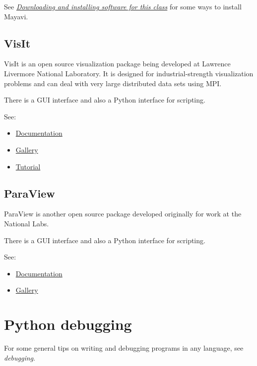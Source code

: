 \documentclass[letterpaper,10pt,english]{sphinxmanual}
\begin{document}
See {\hyperref[software_installation:software-installation]{\emph{Downloading and installing software for this class}}} for some ways to install Mayavi.


\subsection{VisIt}
\label{python_plotting:visit}\label{python_plotting:id1}
VisIt is an open source visualization package being developed at Lawrence Livermore
National Laboratory.  It is designed for industrial-strength visualization problems
and can deal with very large distributed data sets using MPI.

There is a GUI interface and also a Python interface for scripting.

See:
\begin{itemize}
\item {} 
\href{https://wci.llnl.gov/codes/visit/doc.html}{Documentation}

\item {} 
\href{https://wci.llnl.gov/codes/visit/gallery.html}{Gallery}

\item {} 
\href{http://www.visitusers.org/index.php?title=Short\_Tutorial}{Tutorial}

\end{itemize}


\subsection{ParaView}
\label{python_plotting:id4}\label{python_plotting:paraview}
ParaView is another open source package developed originally for work at the
National Labs.

There is a GUI interface and also a Python interface for scripting.

See:
\begin{itemize}
\item {} 
\href{http://www.paraview.org/paraview/help/documentation.html}{Documentation}

\item {} 
\href{http://www.paraview.org/paraview/project/imagegallery.php}{Gallery}

\end{itemize}


\section{Python debugging}
\label{python_debugging:python-debugging}\label{python_debugging::doc}\label{python_debugging:id1}
For some general tips on writing and debugging programs in any language, see
\emph{debugging}.
\end{document}

